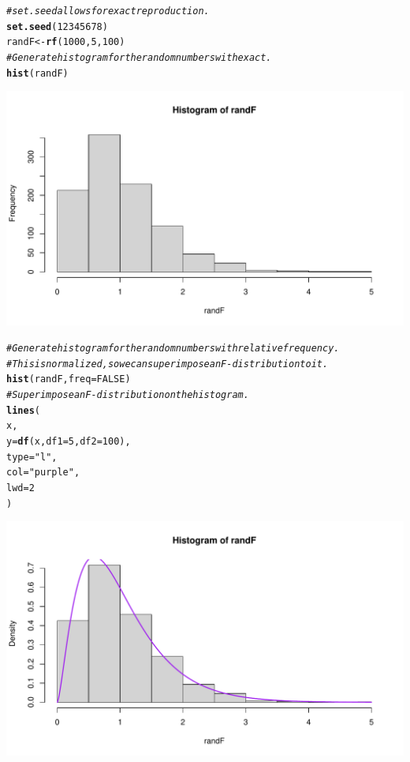 \documentclass[oneside]{book}\usepackage[]{graphicx}\usepackage[dvipsnames,table,xcdraw]{xcolor}
\makeatletter
\def\maxwidth{ %
  \ifdim\Gin@nat@width>\linewidth
    \linewidth
  \else
    \Gin@nat@width
  \fi
}
\newcommand{\hlnum}[1]{\textcolor[rgb]{0.686,0.059,0.569}{#1}}%
\newcommand{\hlstr}[1]{\textcolor[rgb]{0.192,0.494,0.8}{#1}}%
\newcommand{\hlcom}[1]{\textcolor[rgb]{0.678,0.584,0.686}{\textit{#1}}}%
\newcommand{\hlstd}[1]{\textcolor[rgb]{0.345,0.345,0.345}{#1}}%
\newcommand{\hlkwb}[1]{\textcolor[rgb]{0.69,0.353,0.396}{#1}}%
\newcommand{\hlkwc}[1]{\textcolor[rgb]{0.333,0.667,0.333}{#1}}%
\newcommand{\hlkwd}[1]{\textcolor[rgb]{0.737,0.353,0.396}{\textbf{#1}}}%
\newenvironment{kframe}{%
 \def\at@end@of@kframe{}%
 \ifinner\ifhmode%
  \def\at@end@of@kframe{\end{minipage}}%
  \begin{minipage}{\columnwidth}%
 \fi\fi%
 \def\FrameCommand##1{\hskip\@totalleftmargin \hskip-\fboxsep
 \colorbox{shadecolor}{##1}\hskip-\fboxsep
     \hskip-\linewidth \hskip-\@totalleftmargin \hskip\columnwidth}%
 \MakeFramed {\advance\hsize-\width
   \@totalleftmargin\z@ \linewidth\hsize
   \@setminipage}}%
 {\par\unskip\endMakeFramed%
 \at@end@of@kframe}
\newenvironment{knitrout}{}{} %
\makeatother
\begin{document}
\begin{knitrout}
\color{fgcolor}\begin{kframe}
\begin{alltt}
\hlcom{# set.seed allows for exact reproduction.}
\hlkwd{set.seed}\hlstd{(}\hlnum{12345678}\hlstd{)}
\hlstd{randF} \hlkwb{<-} \hlkwd{rf}\hlstd{(}\hlnum{1000}\hlstd{,} \hlnum{5}\hlstd{,} \hlnum{100}\hlstd{)}
\hlcom{# Generate histogram for the random numbers with exact.}
\hlkwd{hist}\hlstd{(randF)}
\end{alltt}
\end{kframe}

{\centering \includegraphics[width=\maxwidth]{figure/unnamed-chunk-35-1} 

}


\begin{kframe}\begin{alltt}
\hlcom{# Generate histogram for the random numbers with relative frequency.}
\hlcom{# This is normalized, so we can superimpose an F-distribution to it.}
\hlkwd{hist}\hlstd{(randF,} \hlkwc{freq} \hlstd{=} \hlnum{FALSE}\hlstd{)}
\hlcom{# Superimpose an F-distribution on the histogram.}
\hlkwd{lines}\hlstd{(}
\hlstd{x,}
\hlkwc{y} \hlstd{=} \hlkwd{df}\hlstd{(x,} \hlkwc{df1} \hlstd{=} \hlnum{5}\hlstd{,} \hlkwc{df2} \hlstd{=} \hlnum{100}\hlstd{),}
\hlkwc{type} \hlstd{=} \hlstr{"l"}\hlstd{,}
\hlkwc{col} \hlstd{=} \hlstr{"purple"}\hlstd{,}
\hlkwc{lwd} \hlstd{=} \hlnum{2}
\hlstd{)}
\end{alltt}
\end{kframe}

{\centering \includegraphics[width=\maxwidth]{figure/unnamed-chunk-35-2} 

}
\end{knitrout}
\end{document}
